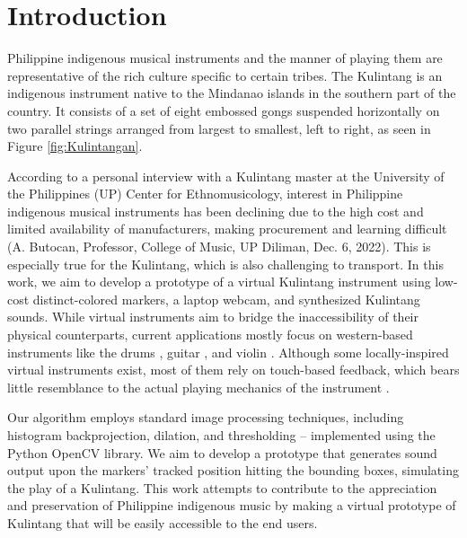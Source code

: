 \documentclass[10pt,a4paper,twoside]{article}
\begin{document}
\maketitle
\thispagestyle{titlestyle}


\section{Introduction}\label{sec:intro}
Philippine indigenous musical instruments and the manner of playing them are representative of the rich culture specific to certain tribes. The Kulintang is an indigenous instrument native to the Mindanao islands in the southern part of the country. It consists of a set of eight embossed gongs suspended horizontally on two parallel strings arranged from largest to smallest, left to right, as seen in Figure \ref{fig:Kulintangan}.

According to a personal interview with a Kulintang master at the University of the Philippines (UP) Center for Ethnomusicology, interest in Philippine indigenous musical instruments has been declining due to the high cost and limited availability of manufacturers, making procurement and learning difficult (A. Butocan, Professor, College of Music, UP Diliman, Dec. 6, 2022). This is especially true for the Kulintang, which is also challenging to transport. In this work, we aim to develop a prototype of a virtual Kulintang instrument using low-cost distinct-colored markers, a laptop webcam, and synthesized Kulintang sounds. While virtual instruments aim to bridge the inaccessibility of their physical counterparts, current applications mostly focus on western-based instruments like the drums \cite{tolentino_air_2019}, guitar \cite{karjalainen_virtual_2006, pakarinen_virtual_2008, tamani_building_2018}, and violin \cite{Fan2013}. Although some locally-inspired virtual instruments exist, most of them rely on touch-based feedback, which bears little resemblance to the actual playing mechanics of the instrument \cite{tanfelix_virtual_2020, baltazar_digital_2020, lucas_digital_2013}.

Our algorithm employs standard image processing techniques, including histogram backprojection, dilation, and thresholding -- implemented using the Python OpenCV library. We aim to develop a prototype that generates sound output upon the markers' tracked position hitting the bounding boxes, simulating the play of a Kulintang. This work attempts to contribute to the appreciation and preservation of Philippine indigenous music by making a virtual prototype of Kulintang that will be easily accessible to the end users.
\end{document}
